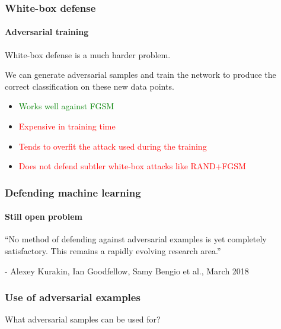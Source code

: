 \documentclass[9pt]{beamer}
\begin{document}
\begin{frame}
  \frametitle{White-box defense}

  \framesubtitle{Adversarial training}

  White-box defense is a much harder problem.

  \medskip

  We can generate adversarial samples and train the network to produce
  the correct classification on these new data points.

  \medskip

  \begin{itemize}
    \item \textcolor{green}{Works well against FGSM}
    \item \textcolor{red}{Expensive in training time}
    \item \textcolor{red}{Tends to overfit the attack used during the training}
    \item \textcolor{red}{Does not defend subtler white-box attacks like RAND+FGSM}
  \end{itemize}
\end{frame}

\begin{frame}

  \frametitle{Defending machine learning}

  \framesubtitle{Still open problem}

  ``No method of defending against adversarial examples is yet
  completely satisfactory. This remains a rapidly evolving research
  area.''

  \bigskip

  - Alexey Kurakin, Ian Goodfellow, Samy Bengio et al., March 2018
\end{frame}

\begin{frame}
  \frametitle{Use of adversarial examples}

  What adversarial samples can be used for?
\end{frame}
\end{document}
